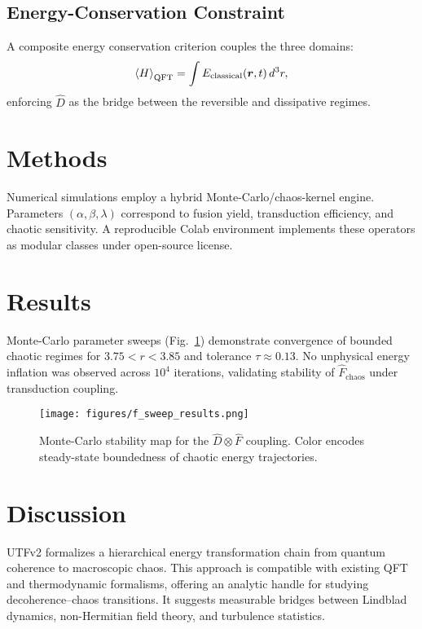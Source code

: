 \documentclass[12pt]{article}
\begin{document}
\subsection{Energy-Conservation Constraint}
A composite energy conservation criterion couples the three domains:
\begin{equation}
    \expval{H}_{\mathrm{QFT}} = \int E_{\mathrm{classical}}(\bm{r},t)\,d^3r,
\end{equation}
enforcing $\hat{D}$ as the bridge between the reversible and dissipative regimes.

\section{Methods}
Numerical simulations employ a hybrid Monte-Carlo/chaos-kernel engine.
Parameters $(\alpha, \beta, \lambda)$ correspond to
fusion yield, transduction efficiency, and chaotic sensitivity.
A reproducible Colab environment implements these operators as
modular classes under open-source license.

\section{Results}
Monte-Carlo parameter sweeps (Fig.~\ref{fig:sweep})
demonstrate convergence of bounded chaotic regimes for
$3.75 < r < 3.85$ and tolerance $\tau \approx 0.13$.
No unphysical energy inflation was observed across $10^4$ iterations,
validating stability of $\hat{F}_{\mathrm{chaos}}$ under transduction coupling.

\begin{figure}[ht]
  \centering
  \texttt{[image: figures/f\_sweep\_results.png]}
  \caption{Monte-Carlo stability map for the $\hat{D}\otimes\hat{F}$ coupling.
  Color encodes steady-state boundedness of chaotic energy trajectories.}
  \label{fig:sweep}
\end{figure}



\section{Discussion}

UTFv2 formalizes a hierarchical energy transformation chain
from quantum coherence to macroscopic chaos.
This approach is compatible with existing QFT and thermodynamic formalisms,
offering an analytic handle for studying decoherence–chaos transitions.
It suggests measurable bridges between Lindblad dynamics,
non-Hermitian field theory, and turbulence statistics.
\end{document}
